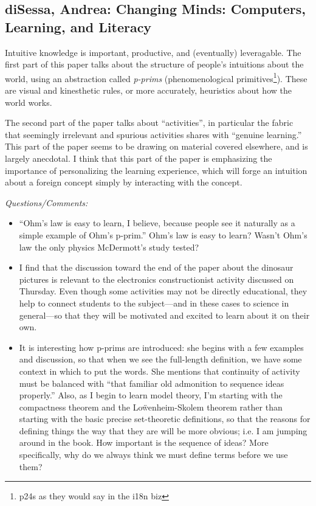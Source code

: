 \documentclass[12pt]{article}
\begin{document}
\subsection*{diSessa, Andrea: Changing Minds: Computers, Learning, and Literacy}

Intuitive knowledge is important, productive, and (eventually)
leveragable.  The first part of this paper talks about the structure of
people's intuitions about the world, using an abstraction called
\textit{p-prims} (phenomenological primitives\footnote{p24s as they
would say in the i18n biz}).  These are visual and kinesthetic rules, or
more accurately, heuristics about how the world works.  

The second part of the paper talks about ``activities'', in particular
the fabric that seemingly irrelevant and spurious activities shares with
``genuine learning.''  This part of the paper seems to be drawing on
material covered elsewhere, and is largely anecdotal.  I think that this
part of the paper is emphasizing the importance of personalizing the
learning experience, which will forge an intuition about a foreign
concept simply by interacting with the concept.

\textit{Questions/Comments:}
\begin{itemize}
\item ``Ohm's law is easy to learn, I believe, because people see it
naturally as a simple example of Ohm's p-prim.''  Ohm's law is easy to
learn?  Wasn't Ohm's law the only physics McDermott's study tested?
\item I find that the discussion toward the end of the paper about the
dinosaur pictures is relevant to the electronics constructionist
activity discussed on Thursday.  Even though some activities may not be
directly educational, they help to connect students to the subject---and
in these cases to science in general---so that they will be motivated
and excited to learn about it on their own.
\item It is interesting how p-prims are introduced: she begins with a
few examples and discussion, so that when we see the full-length
definition, we have some context in which to put the words.  She
mentions that continuity of activity must be balanced with ``that
familiar old admonition to sequence ideas properly.''  Also, as I begin
to learn model theory, I'm starting with the compactness theorem and the
Lo\"wenheim-Skolem theorem rather than starting with the basic
precise set-theoretic definitions, so that the reasons for defining
things the way that they are will be more obvious; i.e. I am jumping
around in the book.  How important is the sequence of ideas?  More
specifically, why do we always think we must define terms before we use
them?
\end{itemize}
\end{document}
